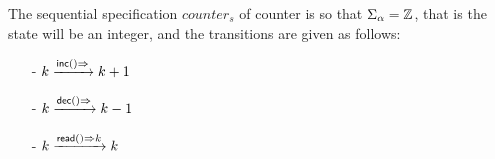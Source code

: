 \begin{example}
\label{definition:sequential specification of counter}
The sequential specification $\mathit{counter}_s$ of counter is so that $\abstates = \mathbb{Z}$, that is the state will be an integer, and the transitions are given as follows:
\begin{itemize}
\setlength{\itemsep}{0.5pt}
\item[-] $k \xrightarrow{\alabellong[\mathsf{inc}]{}{}} k+1$
\item[-] $k \xrightarrow{\alabellong[\mathsf{dec}]{}{}} k-1$
\item[-] $k \xrightarrow{\alabellong[\mathsf{read}]{}{k}} k$
\end{itemize}
\end{example}





